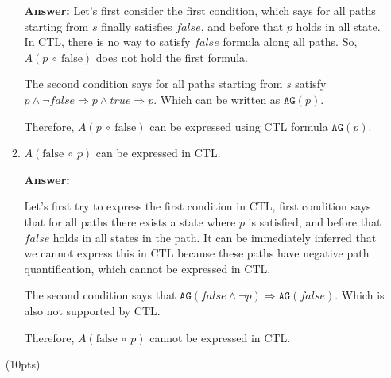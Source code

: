 \documentclass[11pt]{article}
\newcommand{\ag}[1]{\texttt{AG}(#1)}
\begin{document}
\begin{enumerate}
\begin{enumerate}
\textbf{Answer:} Let's first consider the first condition, which says for all paths starting from $s$ finally satisfies $false$, and before that $p$ holds in all state. In CTL, there is no way to satisfy $false$ formula along all paths. So, $A(p\ \circ\ \mbox{false})$ does not hold the first formula. 

The second condition says for all paths starting from $s$ satisfy $p \land \neg false \Rightarrow p \land true \Rightarrow p $. Which can be written as $\ag{p}$. 

Therefore, $A(p\ \circ\ \mbox{false})$ can be expressed using CTL formula $\ag{p}$. 


\item $A(\mbox{false}\ \circ\ p)$ can be expressed in CTL.

\textbf{Answer:}

Let's first try to express the first condition in CTL, first condition says that for all paths there exists a state where $p$ is
  satisfied, and before that $false$ holds in all states in the path. It can be immediately inferred that we cannot express this in CTL because these paths have negative path quantification, which cannot be expressed in CTL. 


  The second condition says that  $\ag{false \land \neg p} \Rightarrow \ag{false}$. Which is also not supported by CTL. 

  Therefore, $A(\mbox{false}\ \circ\ p)$ cannot be expressed in CTL. 

\end{enumerate}
\hfill(10pts)


\end{enumerate}
\end{document}
